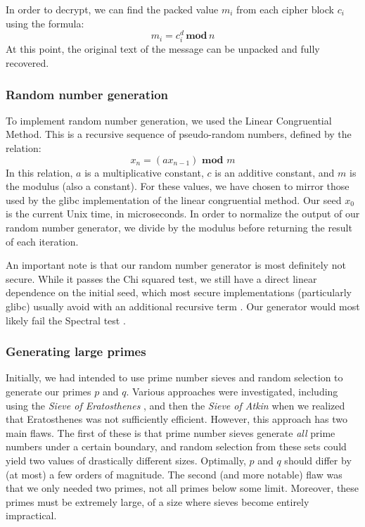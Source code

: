 \documentclass{article}
\begin{document}
In order to decrypt, we can find the packed value $m_i$ from each cipher block $c_i$ using the formula:
	\[ m_i = c_i^d \,\textbf{mod}\, n \]
At this point, the original text of the message can be unpacked and fully recovered.

\subsubsection{Random number generation}
To implement random number generation, we used the Linear Congruential Method. This is a recursive sequence of pseudo-random numbers, defined by the relation:
\[ x_n = (ax_{n - 1}) \textbf{ mod } m \]
In this relation, $a$ is a multiplicative constant, $c$ is an additive constant, and $m$ is the modulus (also a constant). For these values, we have chosen to mirror those used by the glibc implementation of the linear congruential method. Our seed $x_0$ is the current Unix time, in microseconds. In order to normalize the output of our random number generator, we divide by the modulus before returning the result of each iteration.

An important note is that our random number generator is most definitely not secure. While it passes the Chi squared test, we still have a direct linear dependence on the initial seed, which most secure implementations (particularly glibc) usually avoid with an additional recursive term \cite{lcm}. Our generator would most likely fail the Spectral test \cite{spectral}.

\subsubsection{Generating large primes}
Initially, we had intended to use prime number sieves and random selection to generate our primes $p$ and $q$. Various approaches were investigated, including using the \textit{Sieve of Eratosthenes} \cite{sieveeratosthenes}, and then the \textit{Sieve of Atkin} \cite{sieveatkin} when we realized that Eratosthenes was not sufficiently efficient. However, this approach has two main flaws. The first of these is that prime number sieves generate \textit{all} prime numbers under a certain boundary, and random selection from these sets could yield two values of drastically different sizes. Optimally, $p$ and $q$ should differ by (at most) a few orders of magnitude. The second (and more notable) flaw was that we only needed two primes, not all primes below some limit. Moreover, these primes must be extremely large, of a size where sieves become entirely impractical.
\end{document}
